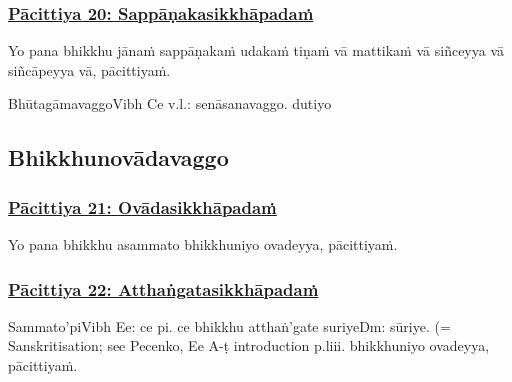 \subsubsection*{\hyperref[exp20]{Pācittiya 20: Sappāṇakasikkhāpadaṁ}}
\label{pac20}

Yo pana bhikkhu jānaṁ sappāṇakaṁ udakaṁ tiṇaṁ vā mattikaṁ vā siñceyya vā siñcāpeyya vā, pācittiyaṁ.

\begin{center}
	Bhūtagāmavaggo\makeatletter\hyperlink{endnote-appendix}\makeatother Vibh Ce v.l.: senāsanavaggo. dutiyo
\end{center}



\subsection{Bhikkhunovādavaggo}

\subsubsection*{\hyperref[exp]{Pācittiya 21: Ovādasikkhāpadaṁ}}
\label{pac21}

Yo pana bhikkhu asammato bhikkhuniyo ovadeyya, pācittiyaṁ.



\subsubsection*{\hyperref[exp22]{Pācittiya 22: Atthaṅgatasikkhāpadaṁ}}
\label{pac22}

Sammato'pi\makeatletter\hyperlink{endnote-appendix}\makeatother Vibh Ee: ce pi. ce bhikkhu atthaṅ'gate suriye\makeatletter\hyperlink{endnote-appendix}\makeatother Dm: sūriye. (= Sanskritisation; see Pecenko, Ee A-ṭ introduction p.liii. bhikkhuniyo ovadeyya, pācittiyaṁ.



